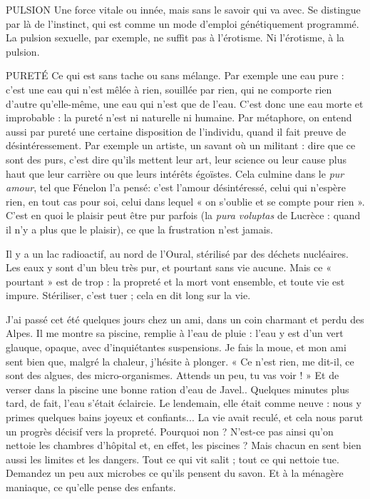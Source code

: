 PULSION Une force vitale ou innée, mais sans le savoir qui va avec. Se distingue
par là de l'instinct, qui est comme un mode d'emploi
génétiquement programmé. La pulsion sexuelle, par exemple, ne suffit pas à
l'érotisme. Ni l'érotisme, à la pulsion.

PURETÉ Ce qui est sans tache ou sans mélange. Par exemple une eau
pure : c’est une eau qui n’est mêlée à rien, souillée par rien, qui
ne comporte rien d’autre qu’elle-même, une eau qui n’est que de l’eau. C’est
donc une eau morte et improbable : la pureté n’est ni naturelle ni humaine.
Par métaphore, on entend aussi par pureté une certaine disposition de
l'individu, quand il fait preuve de désintéressement. Par exemple un artiste, un
savant où un militant : dire que ce sont des purs, c’est dire qu’ils mettent leur
art, leur science ou leur cause plus haut que leur carrière ou que leurs intérêts
égoïstes. Cela culmine dans le {\it pur amour}, tel que Fénelon l’a pensé: c’est
l'amour désintéressé, celui qui n’espère rien, en tout cas pour soi, celui dans
lequel « on s’oublie et se compte pour rien ». C’est en quoi le plaisir peut être
pur parfois (la {\it pura voluptas} de Lucrèce : quand il n’y a plus que le plaisir), ce
que la frustration n’est jamais.

Il y a un lac radioactif, au nord de l’Oural, stérilisé par des déchets
nucléaires. Les eaux y sont d’un bleu très pur, et pourtant sans vie aucune. Mais
ce « pourtant » est de trop : la propreté et la mort vont ensemble, et toute vie
est impure. Stériliser, c’est tuer ; cela en dit long sur la vie.

J'ai passé cet été quelques jours chez un ami, dans un coin charmant et
perdu des Alpes. Il me montre sa piscine, remplie à l’eau de pluie : l’eau y est
d’un vert glauque, opaque, avec d’inquiétantes suspensions. Je fais la moue,
et mon ami sent bien que, malgré la chaleur, j'hésite à plonger. « Ce n’est rien,
me dit-il, ce sont des algues, des micro-organismes. Attends un peu, tu vas
voir ! » Et de verser dans la piscine une bonne ration d’eau de Javel.. Quelques
minutes plus tard, de fait, l’eau s’était éclaircie. Le lendemain, elle était comme
neuve : nous y primes quelques bains joyeux et confiants... La vie avait reculé,
et cela nous parut un progrès décisif vers la propreté. Pourquoi non ? N'est-ce
pas ainsi qu’on nettoie les chambres d’hôpital et, en effet, les piscines ? Mais
chacun en sent bien aussi les limites et les dangers. Tout ce qui vit salit ; tout
ce qui nettoie tue. Demandez un peu aux microbes ce qu’ils pensent du savon.
Et à la ménagère maniaque, ce qu’elle pense des enfants.

